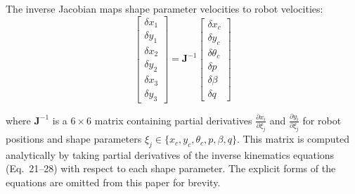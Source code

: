 \documentclass[lettersize,journal]{IEEEtran}
\begin{document}
The inverse Jacobian maps shape parameter velocities to robot velocities:
\begin{equation}
\begin{bmatrix}
\delta x_1 \\ \delta y_1 \\ \delta x_2 \\ \delta y_2 \\ \delta x_3 \\ \delta y_3
\end{bmatrix} =
\mathbf{J}^{-1}
\begin{bmatrix}
\delta x_c \\ \delta y_c \\ \delta \theta_c \\ \delta p \\ \delta \beta \\ \delta q
\end{bmatrix}
\end{equation}

where $\mathbf{J}^{-1}$ is a $6 \times 6$ matrix containing partial derivatives $\frac{\partial x_i}{\partial \xi_j}$ and $\frac{\partial y_i}{\partial \xi_j}$ for robot positions and shape parameters $\xi_j \in \{x_c, y_c, \theta_c, p, \beta, q\}$. This matrix is computed analytically by taking partial derivatives of the inverse kinematics equations (Eq.~21--28) with respect to each shape parameter. The explicit forms of the equations are omitted from this paper for brevity.
\end{document}
